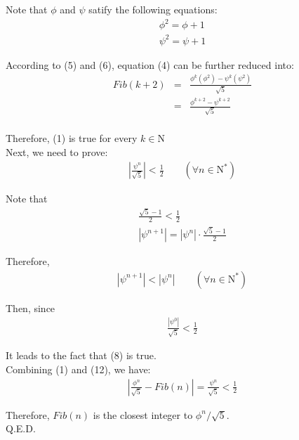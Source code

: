 \documentclass{article}
\begin{document}
    \noindent
    Note that $\phi$ and $\psi$ satify the following equations:
    \begin{eqnarray}
        \phi^{2} = \phi + 1 \\
        \psi^{2} = \psi + 1 
    \end{eqnarray}


    \noindent
    According to (5) and (6), equation (4) can be further reduced into:
    \begin{eqnarray}
        Fib(k + 2) &=& \frac{\phi^{k}(\phi^{2}) 
                       - \psi^{k}(\psi^{2})}{\sqrt{5}} \nonumber \\
                   &=& \frac{\phi^{k + 2} - \psi^{k + 2}}{\sqrt{5}} \nonumber \\
    \end{eqnarray}

    \noindent
    Therefore, (1) is true for every $k \in \mathrm{N}$\\

    \noindent
    Next, we need to prove:
    \begin{eqnarray}
        |\frac{\psi^{n}}{\sqrt{5}}| < \frac{1}{2} \qquad(\forall n \in \mathrm{N^{*}})
    \end{eqnarray}
    

    \noindent
    Note that
    \begin{eqnarray}
        \frac{\sqrt{5} - 1}{2} < \frac{1}{2} \\
        |\psi^{n + 1}| = |\psi^{n}|\cdot \frac{\sqrt{5} - 1}{2}
    \end{eqnarray}

    \noindent
    Therefore, 
    \begin{eqnarray}
        |\psi^{n + 1}| < |\psi^{n}| \qquad(\forall n \in \mathrm{N^{*}})
    \end{eqnarray}


    \noindent
    Then, since
    \begin{eqnarray}
        \frac{|\psi^{0}|}{\sqrt{5}} < \frac{1}{2}
    \end{eqnarray}


    \noindent
    It leads to the fact that (8) is true.\\

    \noindent
    Combining (1) and (12), we have:
    \begin{eqnarray}
        |\frac{\phi^{n}}{\sqrt{5}} - Fib(n)| = \frac{\psi^{n}}{\sqrt{5}} 
        < \frac{1}{2}
    \end{eqnarray}

    \noindent
    Therefore, $Fib(n)$ is the closest integer to $\phi^{n} / \sqrt{5}$.\\

    \noindent
    Q.E.D.

        
\end{document}
